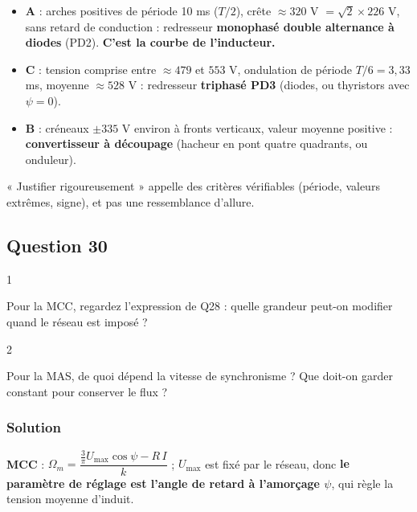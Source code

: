 \documentclass[11pt,a4paper]{article}
\providecommand{\tightlist}{\setlength{\itemsep}{0pt}\setlength{\parskip}{0pt}}
\begin{document}
\begin{itemize}
\tightlist
\item
  \textbf{A} : arches positives de période 10 ms (\(T/2\)), crête \(\approx320\) V \(=\sqrt2\times226\) V, sans retard de conduction : redresseur \textbf{monophasé double alternance à diodes} (PD2). \textbf{C'est la courbe de l'inducteur.}
\item
  \textbf{C} : tension comprise entre \(\approx479\) et \(553\) V, ondulation de période \(T/6=3{,}33\) ms, moyenne \(\approx528\) V : redresseur \textbf{triphasé PD3} (diodes, ou thyristors avec \(\psi=0\)).
\item
  \textbf{B} : créneaux \(\pm335\) V environ à fronts verticaux, valeur moyenne positive : \textbf{convertisseur à découpage} (hacheur en pont quatre quadrants, ou onduleur).
\end{itemize}

\begin{jury}

« Justifier rigoureusement » appelle des critères vérifiables (période, valeurs extrêmes, signe), et pas une ressemblance d'allure.

\end{jury}

\hypertarget{question-30}{%
\subsection{Question 30}\label{question-30}}

\begin{indication}{1}

Pour la MCC, regardez l'expression de Q28 : quelle grandeur peut-on modifier quand le réseau est imposé ?

\end{indication}

\begin{indication}{2}

Pour la MAS, de quoi dépend la vitesse de synchronisme ? Que doit-on garder constant pour conserver le flux ?

\end{indication}

\hypertarget{solution-29}{%
\subsubsection{Solution}\label{solution-29}}

\textbf{MCC} : \(\Omega_m=\dfrac{\frac3\pi U_{\max}\cos\psi-R\,I}k\) ; \(U_{\max}\) est fixé par le réseau, donc \textbf{le paramètre de réglage est l'angle de retard à l'amorçage \(\psi\)}, qui règle la tension moyenne d'induit.
\end{document}
